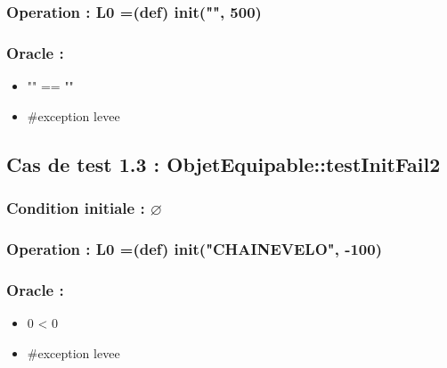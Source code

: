 \documentclass[11pt]{article}
\begin{document}
\subsubsection{Operation : L0 =(def) init("", 500)}
\label{sec-1.2.2}

\subsubsection{Oracle :}
\label{sec-1.2.3}

\begin{itemize}

\item "" == ""\\
\label{sec-1.2.3.1}


\item \#exception levee\\
\label{sec-1.2.3.2}


\end{itemize} %
\subsection{Cas de test 1.3 : ObjetEquipable::testInitFail2}
\label{sec-1.3}

\subsubsection{Condition initiale : $\varnothing$}
\label{sec-1.3.1}

\subsubsection{Operation : L0 =(def) init("CHAINEVELO", -100)}
\label{sec-1.3.2}

\subsubsection{Oracle :}
\label{sec-1.3.3}

\begin{itemize}

\item 0 < 0\\
\label{sec-1.3.3.1}


\item \#exception levee\\
\label{sec-1.3.3.2}

\end{itemize} %
\end{document}
